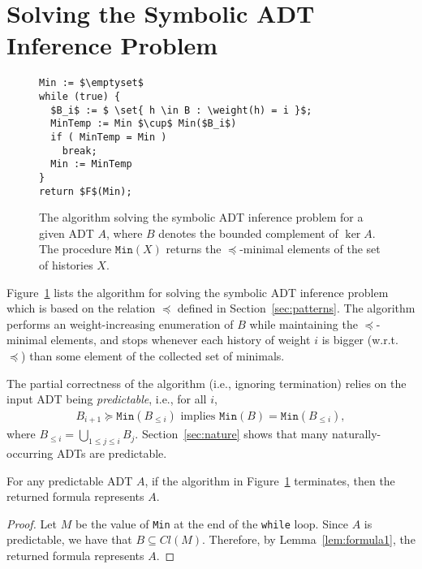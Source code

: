 \section{Solving the Symbolic ADT Inference Problem}
\label{sec:algorithm}

\begin{figure}
\begin{lstlisting}
Min := $\emptyset$
while (true) {
  $B_i$ := $ \set{ h \in B : \weight(h) = i }$;
  MinTemp := Min $\cup$ Min($B_i$)
  if ( MinTemp = Min )
    break;
  Min := MinTemp
}
return $F$(Min);
\end{lstlisting}
\caption{The algorithm solving the symbolic ADT inference problem for a given ADT $A$, where $B$ denotes the bounded complement of $\ker A$. The procedure $\texttt{Min}(X)$ returns the $\preceq$-minimal elements of the set of histories $X$. %
}
\label{fig:algorithm}
\end{figure}

Figure~\ref{fig:algorithm} lists the algorithm for solving the symbolic ADT inference problem which is based on the relation $\preceq$
defined in Section~\ref{sec:patterns}.
The algorithm performs an weight-increasing enumeration of $B$ while maintaining the
$\preceq$-minimal elements, and stops whenever each history of weight $i$ is bigger (w.r.t. $\preceq$) than some
element of the collected set of minimals.

The partial correctness of the algorithm (i.e., ignoring termination) relies on the input ADT being \emph{predictable}, i.e.,
for all $i$,
\begin{align*}
B_{i+1} \succeq \texttt{Min}(B_{\leq i}) \mbox{ implies } \texttt{Min}(B) = \texttt{Min}(B_{\leq i}),
\end{align*}
where $B_{\leq i}=\bigcup_{1\leq j\leq i}B_j$.
Section~\ref{sec:nature} shows that many naturally-occurring ADTs are predictable.

\begin{theorem}\label{th:corr1}
For any predictable ADT $A$, if the algorithm in Figure~\ref{fig:algorithm} terminates, then the returned formula represents $A$.
\end{theorem}
\begin{proof}
Let $M$ be the value of \texttt{Min} at the end of the \texttt{while} loop.
Since $A$ is predictable, we have that $B \subseteq Cl(M)$. %
Therefore, by Lemma~\ref{lem:formula1}, the returned formula represents $A$.
\end{proof}


